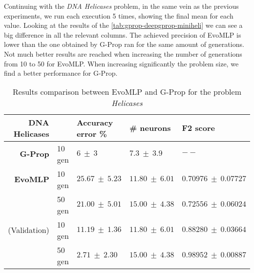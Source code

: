 \documentclass[conference]{IEEEtran}\usepackage[]{graphicx}\usepackage[]{color}
\begin{document}
Continuing with the \emph{DNA Helicases} \cite{dna-helicases} problem, in the
same vein as the previous experiments, we run each execution 5 times, showing
the final mean for each value. Looking at the results of the
\autoref{tab:gprop-deepgprop-miniheli} we can see a big difference in all the
relevant columns. The achieved precision of {\sf EvoMLP} is lower than the one
obtained by G-Prop ran for the same amount of generations. Not much better
results are reached when increasing the number of generations from 10 to 50 for
{\sf EvoMLP}. When increasing significantly the problem size, we find a better
performance for G-Prop.

\begin{table*}
    \centering
    \caption{
        Results comparison between {\sf EvoMLP} and G-Prop for the problem \emph{Helicases}
    }
    \label{tab:gprop-deepgprop-miniheli}
    \begin{tabular}{rllll}
        \textbf{DNA Helicases} &    & \textbf{Accuracy error \%} & \textbf{\# neurons}     & \textbf{F2 score}\\
        \hline
        \textbf{G-Prop}    & 10 gen & $6\ \pm\ 3$            & $7.3\ \pm\ 3.9$     & $--$                    \\
        \textbf{{\sf EvoMLP}} & 10 gen & $25.67\ \pm\ 5.23$     & $11.80\ \pm\ 6.01$  & $0.70976\ \pm\ 0.07727$ \\
                       & 50 gen & $21.00\ \pm\ 5.01$     & $15.00\ \pm\ 4.38$  & $0.72556\ \pm\ 0.06024$ \\
        (Validation) & 10 gen             & $11.19\ \pm\ 1.36$ & $11.80\ \pm\ 6.01$ & $0.88280\ \pm\ 0.03664$ \\
                     & 50 gen             & $2.71\ \pm\ 2.30$ & $15.00\ \pm\ 4.38$ & $0.98952\ \pm\ 0.00887$ \\
    \end{tabular}
\end{table*}

\end{document}

